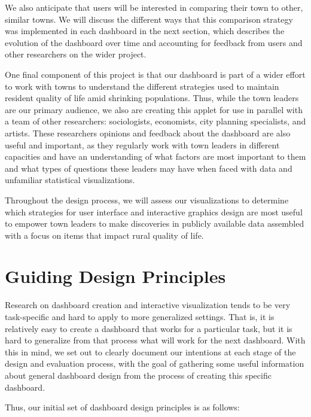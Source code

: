 \documentclass[print]{nuthesis}
\begin{document}
We also anticipate that users will be interested in comparing their town to other, similar towns. We will discuss the different ways that this comparison strategy was implemented in each dashboard in the next section, which describes the evolution of the dashboard over time and accounting for feedback from users and other researchers on the wider project.

One final component of this project is that our dashboard is part of a wider effort to work with towns to understand the different strategies used to maintain resident quality of life amid shrinking populations. Thus, while the town leaders are our primary audience, we also are creating this applet for use in parallel with a team of other researchers: sociologists, economists, city planning specialists, and artists. These researchers opinions and feedback about the dashboard are also useful and important, as they regularly work with town leaders in different capacities and have an understanding of what factors are most important to them and what types of questions these leaders may have when faced with data and unfamiliar statistical visualizations.

Throughout the design process, we will assess our visualizations to determine which strategies for user interface and interactive graphics design are most useful to empower town leaders to make discoveries in publicly available data assembled with a focus on items that impact rural quality of life.

\hypertarget{guiding-design-principles}{%
\section{Guiding Design Principles}\label{guiding-design-principles}}

Research on dashboard creation and interactive visualization tends to be very task-specific and hard to apply to more generalized settings. That is, it is relatively easy to create a dashboard that works for a particular task, but it is hard to generalize from that process what will work for the next dashboard. With this in mind, we set out to clearly document our intentions at each stage of the design and evaluation process, with the goal of gathering some useful information about general dashboard design from the process of creating this specific dashboard.

Thus, our initial set of dashboard design principles is as follows:
\end{document}
